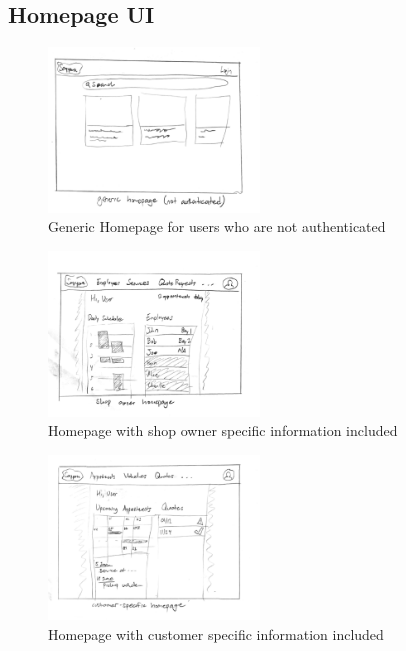 \documentclass[12pt, titlepage]{article}
\begin{document}
\subsection{Homepage UI}
\begin{figure}[H]
    \centering
    \includegraphics[width=0.5\textwidth]{Design/SystDesign/homepages/ui_genericHome.png}
    \caption{Generic Homepage for users who are not authenticated}
    \label{fig:genericHomepage}
\end{figure}

\begin{figure}[H]
    \centering
    \includegraphics[width=0.5\textwidth]{Design/SystDesign/homepages/ui_ownerHome.png}
    \caption{Homepage with shop owner specific information included}
    \label{fig:ownerHomepage}
\end{figure}

\begin{figure}[H]
    \centering
    \includegraphics[width=0.5\textwidth]{Design/SystDesign/homepages/ui_custHome.png}
    \caption{Homepage with customer specific information included}
    \label{fig:custHomepage}
\end{figure}
\end{document}
